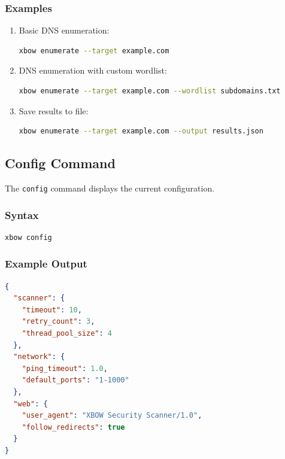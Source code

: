 \documentclass[12pt,a4paper]{report}
\begin{document}
\subsubsection{Examples}

\begin{enumerate}
    \item Basic DNS enumeration:
    \begin{lstlisting}[language=bash]
    xbow enumerate --target example.com
    \end{lstlisting}
    
    \item DNS enumeration with custom wordlist:
    \begin{lstlisting}[language=bash]
    xbow enumerate --target example.com --wordlist subdomains.txt
    \end{lstlisting}
    
    \item Save results to file:
    \begin{lstlisting}[language=bash]
    xbow enumerate --target example.com --output results.json
    \end{lstlisting}
\end{enumerate}

\subsection{Config Command}

The \texttt{config} command displays the current configuration.

\subsubsection{Syntax}

\begin{lstlisting}[language=bash]
xbow config
\end{lstlisting}

\subsubsection{Example Output}

\begin{lstlisting}[language=json]
{
  "scanner": {
    "timeout": 10,
    "retry_count": 3,
    "thread_pool_size": 4
  },
  "network": {
    "ping_timeout": 1.0,
    "default_ports": "1-1000"
  },
  "web": {
    "user_agent": "XBOW Security Scanner/1.0",
    "follow_redirects": true
  }
}
\end{lstlisting}
\end{document}
